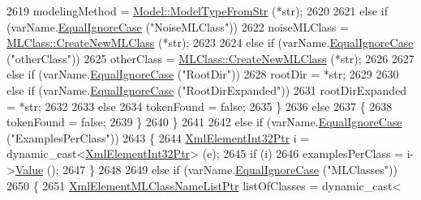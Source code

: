 \begin{DoxyCode}
2619           modelingMethod = \hyperlink{class_k_k_m_l_l_1_1_model_a20e033472417caafa2cd577dcb7ae6a9}{Model::ModelTypeFromStr} (*str);
2620 
2621         \textcolor{keywordflow}{else} \textcolor{keywordflow}{if}  (varName.\hyperlink{class_k_k_b_1_1_k_k_str_a562f9696417c53f66bc4088eac072ab5}{EqualIgnoreCase} (\textcolor{stringliteral}{"NoiseMLClass"}))
2622           noiseMLClass = \hyperlink{class_k_k_m_l_l_1_1_m_l_class_a9fd24c617c42d89afc92414575e00e9a}{MLClass::CreateNewMLClass} (*str);
2623 
2624         \textcolor{keywordflow}{else} \textcolor{keywordflow}{if}  (varName.\hyperlink{class_k_k_b_1_1_k_k_str_a562f9696417c53f66bc4088eac072ab5}{EqualIgnoreCase} (\textcolor{stringliteral}{"otherClass"}))
2625           otherClass = \hyperlink{class_k_k_m_l_l_1_1_m_l_class_a9fd24c617c42d89afc92414575e00e9a}{MLClass::CreateNewMLClass} (*str);
2626 
2627         \textcolor{keywordflow}{else} \textcolor{keywordflow}{if}  (varName.\hyperlink{class_k_k_b_1_1_k_k_str_a562f9696417c53f66bc4088eac072ab5}{EqualIgnoreCase} (\textcolor{stringliteral}{"RootDir"}))
2628           rootDir = *str;
2629 
2630         \textcolor{keywordflow}{else} \textcolor{keywordflow}{if}  (varName.\hyperlink{class_k_k_b_1_1_k_k_str_a562f9696417c53f66bc4088eac072ab5}{EqualIgnoreCase} (\textcolor{stringliteral}{"RootDirExpanded"}))
2631           rootDirExpanded = *str;
2632 
2633         \textcolor{keywordflow}{else}
2634           tokenFound = \textcolor{keyword}{false};
2635       \}
2636       \textcolor{keywordflow}{else}
2637       \{
2638         tokenFound = \textcolor{keyword}{false};
2639       \}
2640     \}
2641 
2642     \textcolor{keywordflow}{else} \textcolor{keywordflow}{if}  (varName.\hyperlink{class_k_k_b_1_1_k_k_str_a562f9696417c53f66bc4088eac072ab5}{EqualIgnoreCase}  (\textcolor{stringliteral}{"ExamplesPerClass"}))
2643     \{
2644       \hyperlink{class_k_k_b_1_1_xml_element_int32}{XmlElementInt32Ptr}  i = \textcolor{keyword}{dynamic\_cast<}\hyperlink{class_k_k_b_1_1_xml_element_int32}{XmlElementInt32Ptr}\textcolor{keyword}{>} (e);
2645       \textcolor{keywordflow}{if}  (i)
2646         examplesPerClass = i->\hyperlink{class_k_k_b_1_1_xml_element_int32_a37c999e6762841736ed3d1c03ed87d34}{Value} ();
2647     \}
2648 
2649     \textcolor{keywordflow}{else} \textcolor{keywordflow}{if}  (varName.\hyperlink{class_k_k_b_1_1_k_k_str_a562f9696417c53f66bc4088eac072ab5}{EqualIgnoreCase}  (\textcolor{stringliteral}{"MLClasses"}))
2650     \{
2651       \hyperlink{class_k_k_m_l_l_1_1_xml_element_m_l_class_name_list}{XmlElementMLClassNameListPtr}  listOfClasses = \textcolor{keyword}{dynamic\_cast<}

\end{DoxyCode}
